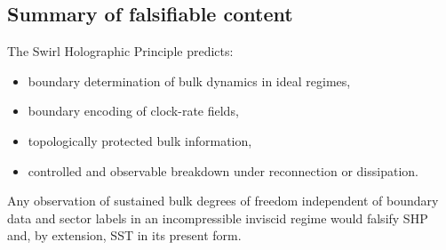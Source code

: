 \documentclass[11pt]{article}
\begin{document}
    \subsection{Summary of falsifiable content}

    The Swirl Holographic Principle predicts:
    \begin{itemize}
        \item boundary determination of bulk dynamics in ideal regimes,
        \item boundary encoding of clock-rate fields,
        \item topologically protected bulk information,
        \item controlled and observable breakdown under reconnection or dissipation.
    \end{itemize}

    Any observation of sustained bulk degrees of freedom independent of boundary data
    and sector labels in an incompressible inviscid regime would falsify SHP and, by
    extension, SST in its present form.
\end{document}
